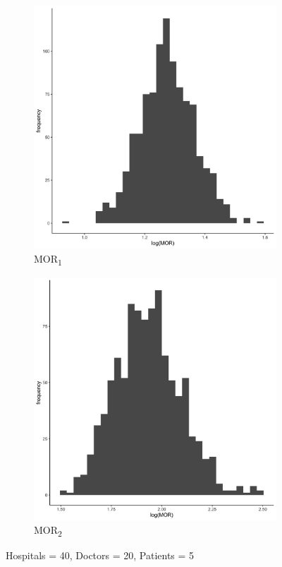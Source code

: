 \documentclass[
  letterpaper,
  DIV=11,
  numbers=noendperiod,
  titlepage]{scrartcl}
\begin{document}
\vspace{15mm}

\begin{figure}
\centering
\begin{subfigure}{.49\textwidth}
    \centering
    \includegraphics[width=.95\linewidth]{../../plots/three-lvl-ran-int/high-prev/hist_40_20_5_three_lvl_high_prev_mor1.png}  
    \caption{MOR\textsubscript{1}}
    \label{l40m20n101}
\end{subfigure}
\begin{subfigure}{.49\textwidth}
    \centering
    \includegraphics[width=.95\linewidth]{../../plots/three-lvl-ran-int/high-prev/hist_40_20_5_three_lvl_high_prev_mor2.png}
    \caption{MOR\textsubscript{2}}
    \label{l40m20n102}
\end{subfigure}
\caption{Hospitals = 40, Doctors = 20, Patients = 5}
\label{mor2}
\end{figure}
\end{document}
